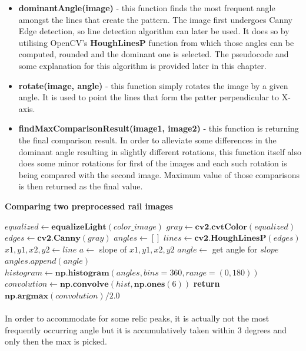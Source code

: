 \begin{itemize}
	\item \textbf{dominantAngle(image)} - this function finds the most frequent angle amongst the lines that create the pattern. The image first undergoes Canny Edge detection, so line detection algorithm can later be used. It does so by utilising OpenCV's \textbf{HoughLinesP} function from which those angles can be computed, rounded and the dominant one is selected. The pseudocode and some explanation for this algorithm is provided later in this chapter.
	\item \textbf{rotate(image, angle)} - this function simply rotates the image by a given angle. It is used to point the lines that form the patter perpendicular to X-axis.
	\item \textbf{findMaxComparisonResult(image1, image2)} - this function is returning the final comparison result. In order to alleviate some differences in the dominant angle resulting in slightly different rotations, this function itself also does some minor rotations for first of the images and each such rotation is being compared with the second image. Maximum value of those comparisons is then returned as the final value.
\end{itemize}

\begin{algorithm}{\textbf{Comparing two preprocessed rail images}}
	\begin{spacing}{1.5}
	\begin{algorithmic}[1]
			\State $equalized \gets \textbf{equalizeLight}(color\_image)$
			\State $gray \gets \textbf{cv2.cvtColor}(equalized)$
			\State $edges \gets \textbf{cv2.Canny}(gray)$
			\State $angles \gets []$
			\State $lines \gets \textbf{cv2.HoughLinesP}(edges)$
				\State $x1, y1, x2, y2 \gets line$
				\State $a \gets $ slope of $x1, y1, x2, y2$
				\State $angle \gets$ get angle for $slope$
				\State $angles.append(angle)$
			\EndFor
			\State $histogram \gets \textbf{np.histogram}(angles, bins=360, range=(0, 180))$
			\State $convolution \gets \textbf{np.convolve}(hist, \textbf{np.ones}(6))$
			\State \textbf{return} $\textbf{np.argmax}(convolution) / 2.0$
		\EndFunction
	\end{algorithmic}
	\end{spacing}
\end{algorithm}

\paragraph{}
In order to accommodate for some relic peaks, it is actually not the most frequently occurring angle but it is accumulatively taken within 3 degrees and only then the max is picked.

